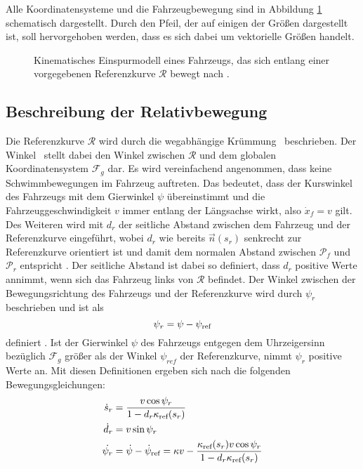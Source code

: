 Alle Koordinatensysteme und die Fahrzeugbewegung sind in Abbildung \ref{fig:Fahrzeugmodell} schematisch dargestellt. Durch den Pfeil, der auf einigen der Größen dargestellt ist, soll hervorgehoben werden, dass es sich dabei um vektorielle Größen handelt. 
\begin{figure}[h]
	\centering
	\fontsize{24pt}{16pt}\selectfont
	\caption{Kinematisches Einspurmodell eines Fahrzeugs, das sich entlang einer vorgegebenen Referenzkurve $\mathcal{R}$ bewegt nach \cite{Rathgeber.2016}.}
	\label{fig:Fahrzeugmodell}
\end{figure}

\subsection{Beschreibung der Relativbewegung}\label{subsec:Relativbewegung}
Die Referenzkurve $\mathcal{R}$ wird durch die wegabhängige Krümmung \kapparefofs~beschrieben. Der Winkel \psiref~stellt dabei den Winkel zwischen $\mathcal{R}$ und dem globalen Koordinatensystem $\mathcal{F}_g$ dar. Es wird vereinfachend angenommen, dass keine Schwimmbewegungen im Fahrzeug auftreten. Das bedeutet, dass der Kurswinkel des Fahrzeugs mit dem Gierwinkel $\psi$ übereinstimmt und die Fahrzeuggeschwindigkeit $v$ immer entlang der Längsachse wirkt, also $\dot{x}_f = v$ gilt. Des Weiteren wird mit $d_r$ der seitliche Abstand zwischen dem Fahrzeug und der Referenzkurve eingeführt, wobei $d_r$ wie bereits $\vec{{n}}(s_r)$ senkrecht zur Referenzkurve orientiert ist und damit dem normalen Abstand zwischen $\mathcal{P}_f$ und $\mathcal{P}_r$ entspricht \cite{Rathgeber.2016}. Der seitliche Abstand ist dabei so definiert, dass $d_r$ positive Werte annimmt, wenn sich das Fahrzeug links von $\mathcal{R}$ befindet. Der Winkel zwischen der Bewegungsrichtung des Fahrzeugs und der Referenzkurve wird durch $\psi_r$ beschrieben und ist als \begin{equation}
	\psi_r = \psi - \psi_{\textrm{ref}}
\end{equation}
definiert \cite{Rathgeber.2016}. Ist der Gierwinkel $\psi$ des Fahrzeugs entgegen dem Uhrzeigersinn bezüglich $\mathcal{F}_g$ größer als der Winkel $\psi_{ref}$ der Referenzkurve, nimmt $\psi_r$ positive Werte an. Mit diesen Definitionen ergeben sich nach \cite{Rathgeber.2016} die folgenden Bewegungsgleichungen:
\begin{align}
	\dot{s}_r &= \frac{v\cos{\psi_r}}{1-d_r\kappa_{\textrm{ref}}(s_r)} \label{eq:dsr} \\
	\dot{d}_r &= v\sin{\psi_r} \label{eq:ddr} \\
	\dot{\psi_r} &= \dot{\psi} -\dot{\psi}_\textrm{ref} = \kappa v - \frac{\kappa_{\textrm{ref}}(s_r) v\cos{\psi_r}}{1-d_r\kappa_{\textrm{ref}}(s_r)} \label{eq:dpsir}
\end{align}
